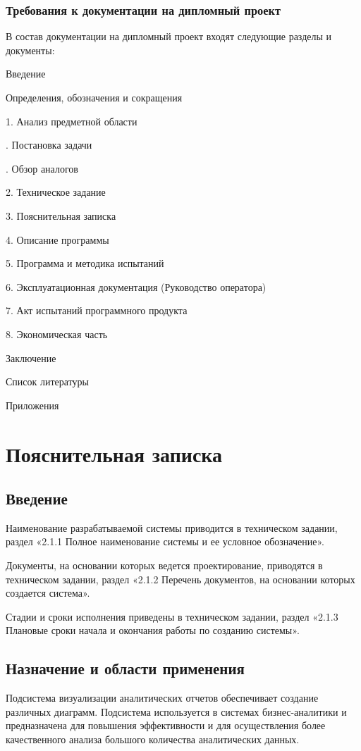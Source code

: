 \documentclass[a4paper]{extarticle}
\begin{document}
\subsubsection{Требования к документации на дипломный проект}
В состав документации на дипломный проект входят следующие разделы и документы:\par
Введение\par
\qquad Определения, обозначения и сокращения\par
1.	Анализ предметной области\par
{}.	Постановка задачи\par
{}.	Обзор аналогов\par
2.	Техническое задание\par
3.	Пояснительная записка\par
4.	Описание программы\par
5.	Программа и методика испытаний\par
6.	Эксплуатационная документация (Руководство оператора)\par
7.	Акт испытаний программного продукта\par
8.	Экономическая часть\par
Заключение\par
Список литературы\par
Приложения\par

\section{Пояснительная записка}

\subsection*{Введение}
Наименование разрабатываемой системы приводится в техническом задании, раздел «2.1.1 Полное наименование системы и ее условное обозначение».\par
Документы, на основании которых ведется проектирование, приводятся в техническом задании, раздел «2.1.2 Перечень документов, на основании которых создается система».\par
Стадии и сроки исполнения приведены в техническом задании, раздел «2.1.3 Плановые сроки начала и окончания работы по созданию системы».

\subsection{Назначение и области применения}
Подсистема визуализации аналитических отчетов обеспечивает создание различных диаграмм. Подсистема используется в системах бизнес-аналитики и предназначена для повышения эффективности и для осуществления более качественного анализа большого количества аналитических данных.
\end{document}
